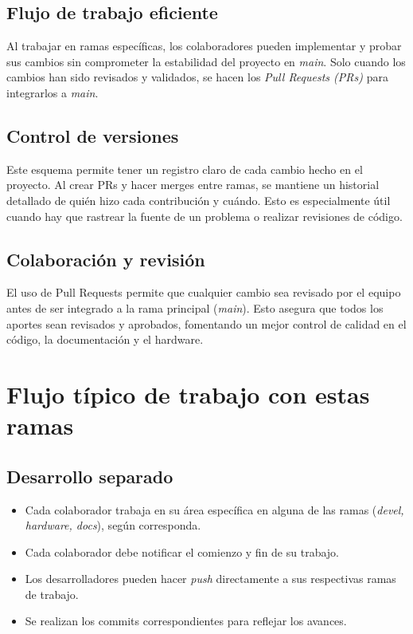 \documentclass[a4paper]{article}
\begin{document}
    \subsection{Flujo de trabajo eficiente}
    \indent Al trabajar en ramas específicas, los colaboradores pueden implementar y probar sus cambios sin comprometer la estabilidad del proyecto en \textit{main}. Solo cuando los cambios han sido revisados y validados, se hacen los \textit{Pull Requests (PRs)} para integrarlos a \textit{main}.
    \subsection{Control de versiones}
    \indent Este esquema permite tener un registro claro de cada cambio hecho en el proyecto. Al crear PRs y hacer merges entre ramas, se mantiene un historial detallado de quién hizo cada contribución y cuándo. Esto es especialmente útil cuando hay que rastrear la fuente de un problema o realizar revisiones de código.
    \subsection{Colaboración y revisión}
    El uso de Pull Requests permite que cualquier cambio sea revisado por el equipo antes de ser integrado a la rama principal (\textit{main}). Esto asegura que todos los aportes sean revisados y aprobados, fomentando un mejor control de calidad en el código, la documentación y el hardware.

\section{Flujo típico de trabajo con estas ramas}
    \subsection{Desarrollo separado}
        \begin{itemize}
            \item Cada colaborador trabaja en su área específica en alguna de las ramas (\textit{devel, hardware, docs}), según corresponda.
            \item Cada colaborador debe notificar el comienzo y fin de su trabajo.
            \item Los desarrolladores pueden hacer \textit{push} directamente a sus respectivas ramas de trabajo.
            \item Se realizan los commits correspondientes para reflejar los avances.
        \end{itemize}
\end{document}
